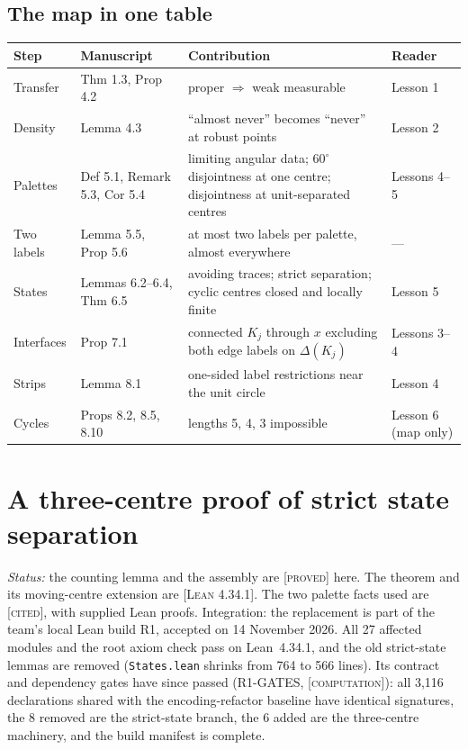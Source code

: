 \documentclass[11pt]{article}
\theoremstyle{definition}
\theoremstyle{remark}
\newcommand{\st}[1]{\textsc{[#1]}}
\begin{document}
\subsection{The map in one table}
\begin{center}\small
\begin{tabularx}{\linewidth}{@{}l l X l@{}}
\toprule
Step & Manuscript & Contribution & Reader\\
\midrule
Transfer & Thm 1.3, Prop 4.2 & proper $\Rightarrow$ weak measurable & Lesson 1\\
Density & Lemma 4.3 & ``almost never'' becomes ``never'' at robust points & Lesson 2\\
Palettes & Def 5.1, Remark 5.3, Cor 5.4 & limiting angular data; $60^\circ$ disjointness at one centre; disjointness at unit-separated centres & Lessons 4--5\\
Two labels & Lemma 5.5, Prop 5.6 & at most two labels per palette, almost everywhere & ---\\
States & Lemmas 6.2--6.4, Thm 6.5 & avoiding traces; strict separation; cyclic centres closed and locally finite & Lesson 5\\
Interfaces & Prop 7.1 & connected $K_j$ through $x$ excluding both edge labels on $\Delta(K_j)$ & Lessons 3--4\\
Strips & Lemma 8.1 & one-sided label restrictions near the unit circle & Lesson 4\\
Cycles & Props 8.2, 8.5, 8.10 & lengths 5, 4, 3 impossible & Lesson 6 (map only)\\
\bottomrule
\end{tabularx}
\end{center}

\section{A three-centre proof of strict state separation}
\emph{Status:} the counting lemma and the assembly are \st{proved} here. The theorem and its moving-centre extension are \st{Lean 4.34.1}. The two palette facts used are \st{cited}, with supplied Lean proofs. Integration: the replacement is part of the team's local Lean build R1, accepted on 14 November 2026. All 27 affected modules and the root axiom check pass on Lean~4.34.1, and the old strict-state lemmas are removed (\texttt{States.lean} shrinks from 764 to 566 lines). Its contract and dependency gates have since passed (R1-GATES, \st{computation}): all 3,116 declarations shared with the encoding-refactor baseline have identical signatures, the 8 removed are the strict-state branch, the 6 added are the three-centre machinery, and the build manifest is complete.
\end{document}
